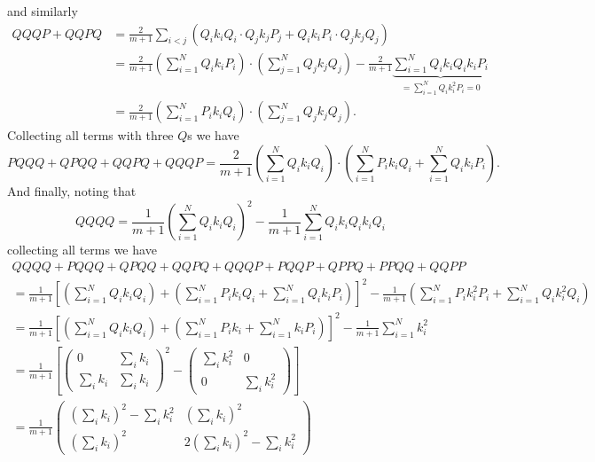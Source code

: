 \documentclass[a4paper,11pt]{article}
\numberwithin{equation}{section}
\begin{document}
	and similarly\begin{equation}
	\begin{aligned}
	QQQP+QQPQ&=\frac{2}{m+1}\sum_{i<j}\left(Q_ik_iQ_i\cdot Q_jk_jP_j+Q_ik_iP_i\cdot Q_jk_jQ_j\right)\\&=\frac{2}{m+1}\left(\sum_{i=1}^{N}Q_ik_iP_i\right)\cdot\left(\sum_{j=1}^{N}Q_jk_jQ_j\right)-\frac{2}{m+1}\underbrace{\sum_{i=1}^{N}Q_ik_iQ_ik_iP_i}_{=\sum_{i=1}^{N}Q_ik_i^2P_i=0}\\
	&=\frac{2}{m+1}\left(\sum_{i=1}^{N}P_ik_iQ_i\right)\cdot\left(\sum_{j=1}^{N}Q_jk_jQ_j\right).
	\end{aligned}
	\end{equation}
	Collecting all terms with three $ Q $s we have \begin{equation}
	PQQQ+QPQQ+QQPQ+QQQP=\frac{2}{m+1}\left(\sum_{i=1}^{N}Q_ik_iQ_i\right)\cdot\left(\sum_{i=1}^{N}P_ik_iQ_i+\sum_{i=1}^{N}Q_ik_iP_i\right).
	\end{equation}
	And finally, noting that \begin{equation}
	QQQQ=\frac{1}{m+1}\left(\sum_{i=1}^{N}Q_ik_iQ_i\right)^2-\frac{1}{m+1}\sum_{i=1}^{N}Q_ik_iQ_ik_iQ_i
	\end{equation} collecting all terms we have \begin{equation}
	\begin{aligned}
	QQQQ+PQQQ+QPQQ+QQPQ+QQQP+PQQP+QPPQ+PPQQ+QQPP\\
	=\frac{1}{m+1}\left[\left(\sum_{i=1}^{N}Q_ik_iQ_i\right)+\left(\sum_{i=1}^{N}P_ik_iQ_i+\sum_{i=1}^{N}Q_ik_iP_i\right)\right]^2
	-\frac{1}{m+1}\left(\sum_{i=1}^{N}P_ik_i^2P_i+\sum_{i=1}^{N}Q_ik_i^2Q_i\right)\\
	=\frac{1}{m+1}\left[\left(\sum_{i=1}^{N}Q_ik_iQ_i\right)+\left(\sum_{i=1}^{N}P_ik_i+\sum_{i=1}^{N}k_iP_i\right)\right]^2
	-\frac{1}{m+1}\sum_{i=1}^{N}k_i^2\\
	=\frac{1}{m+1}\left[\begin{pmatrix}
		0& \sum_{i}k_i\\\sum_{i}k_i&\sum_{i}k_i
	\end{pmatrix}^2-\begin{pmatrix}
	\sum_{i}k_i^2&0\\
	0& \sum_{i}k_i^2
	\end{pmatrix}\right]\\
	=\frac{1}{m+1}\begin{pmatrix}
	(\sum_{i}k_i)^2-\sum_{i}k_i^2&(\sum_{i}k_i)^2\\
	(\sum_{i}k_i)^2& 2(\sum_{i}k_i)^2-\sum_{i}k_i^2 
	\end{pmatrix}
	\end{aligned}
	\end{equation}
\end{document}
